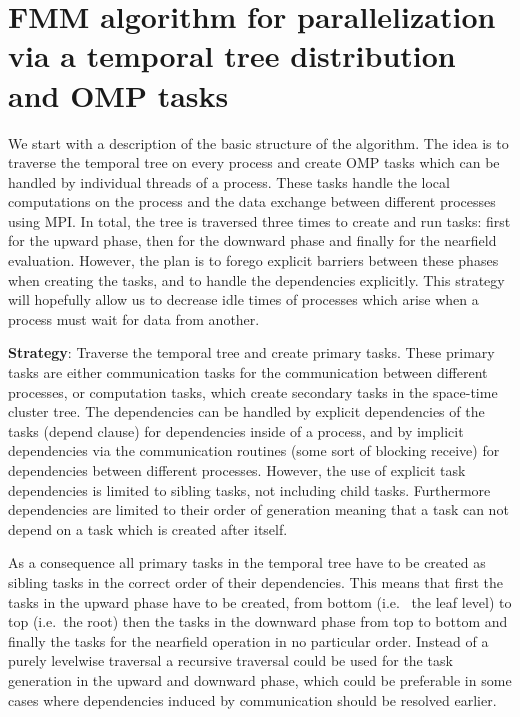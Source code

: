 \documentclass[a4paper,11pt]{article}
\theoremstyle{plain}
\theoremstyle{definition}
\theoremstyle{remark}
\begin{document}
\newpage

\section{FMM algorithm for parallelization via a temporal tree distribution and OMP tasks}
We start with a description of the basic structure of the algorithm. The idea is to traverse the temporal tree on every
process and create OMP tasks which can be handled by individual threads of a process. These tasks handle the local 
computations on the process and the data exchange between different processes using MPI. In total, the tree is 
traversed three times to create and run tasks: first for the upward phase, then for the downward phase and finally for 
the nearfield evaluation. However, the plan is to forego explicit barriers between these phases when creating the 
tasks, and to handle the dependencies explicitly. This strategy will hopefully allow us to decrease idle times of 
processes which arise when a process must wait for data from another.

\textbf{Strategy}: Traverse the temporal tree and create primary tasks. These primary tasks are either communication
tasks for the communication between different processes, or computation tasks, which create secondary tasks in the 
space-time cluster tree. The dependencies can be handled by explicit dependencies of the tasks (depend clause) for 
dependencies inside of a process, and by implicit dependencies via the communication routines (some sort of blocking 
receive) for dependencies between different processes. However, the use of explicit task dependencies is limited to 
sibling tasks, not including child tasks. Furthermore dependencies are limited to their order of generation meaning 
that a task can not depend on a task which is created after itself.

As a consequence all primary tasks in the temporal tree have to be created as sibling tasks in the correct order of
their dependencies. This means that first the tasks in the upward phase have to be created, from bottom (i.e.~
the leaf level) to top (i.e.~the root) then the tasks in the downward phase from top to bottom and finally the tasks
for the nearfield operation in no particular order. Instead of a purely levelwise traversal a recursive traversal
could be used for the task generation in the upward and downward phase, which could be preferable in some cases where 
dependencies induced by communication should be resolved earlier. 
\end{document}
